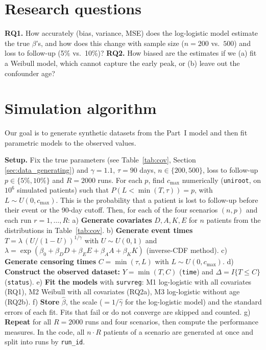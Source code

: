 \documentclass[10pt,a4paper]{article}
\begin{document}
\section{Research questions}
\textbf{RQ1.} How accurately (bias, variance, MSE) does the log-logistic model estimate the true $\beta$'s, and how does this change with sample size ($n=200$ vs.\ $500$) and loss to follow-up (5\% vs.\ 10\%)?
\textbf{RQ2.} How biased are the estimates if we (a) fit a Weibull model, which cannot capture the early peak, or (b) leave out the confounder age?

\newpage
\section{Simulation algorithm}
Our goal is to generate synthetic datasets from the Part~I model and then fit parametric models to the observed values.

\textbf{Setup.} Fix the true parameters (see Table~\ref{tab:cov}, Section \ref{sec:data_generating}) and $\gamma=1.1$, $\tau=90$ days, $n\in\{200,500\}$, loss to follow-up $p\in\{5\%,10\%\}$ and $R=2000$ runs. For each $p$, find $c_{\max}$ numerically (\texttt{uniroot}, on $10^6$ simulated patients) such that $P(L<\min(T,\tau))=p$, with $L\sim U(0,c_{\max})$. This is the probability that a patient is lost to follow-up before their event or the 90-day cutoff. Then, for each of the four scenarios $(n,p)$ and each run $r=1,\dots,R$: a) \textbf{Generate covariates} $D,A,K,E$ for $n$ patients from the distributions in Table~\ref{tab:cov}. b) \textbf{Generate event times} $T=\lambda\,(U/(1-U))^{1/\gamma}$ with $U\sim U(0,1)$ and $\lambda=\exp(\beta_0+\beta_D D+\beta_E E+\beta_A A+\beta_K K)$ (inverse-CDF method). c) \textbf{Generate censoring times} $C=\min(\tau,L)$ with $L\sim U(0,c_{\max})$. d) \textbf{Construct the observed dataset:} $Y=\min(T,C)$ (\texttt{time}) and $\Delta=I\{T\le C\}$ (\texttt{status}). e) \textbf{Fit the models} with \texttt{survreg}: M1 log-logistic with all covariates (RQ1), M2 Weibull with all covariates (RQ2a), M3 log-logistic without age (RQ2b). f) \textbf{Store} $\hat\beta$, the scale ($=1/\hat\gamma$ for the log-logistic model) and the standard errors of each fit. Fits that fail or do not converge are skipped and counted. g) \textbf{Repeat} for all $R=2000$ runs and four scenarios, then compute the performance measures. In the code, all $n\cdot R$ patients of a scenario are generated at once and split into runs by \texttt{run\_id}.
\end{document}
